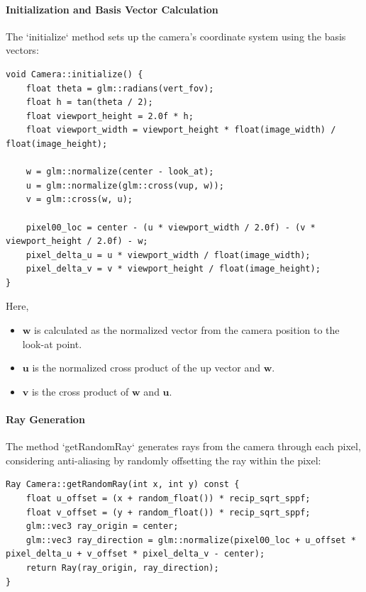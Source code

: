 \documentclass[12pt]{article}
\begin{document}
\paragraph{Initialization and Basis Vector Calculation}
The `initialize` method sets up the camera's coordinate system using the basis vectors:

\begin{verbatim}
void Camera::initialize() {
    float theta = glm::radians(vert_fov);
    float h = tan(theta / 2);
    float viewport_height = 2.0f * h;
    float viewport_width = viewport_height * float(image_width) / float(image_height);

    w = glm::normalize(center - look_at);
    u = glm::normalize(glm::cross(vup, w));
    v = glm::cross(w, u);

    pixel00_loc = center - (u * viewport_width / 2.0f) - (v * viewport_height / 2.0f) - w;
    pixel_delta_u = u * viewport_width / float(image_width);
    pixel_delta_v = v * viewport_height / float(image_height);
}
\end{verbatim}

Here,
\begin{itemize}
    \item \(\mathbf{w}\) is calculated as the normalized vector from the camera position to the look-at point.
    \item \(\mathbf{u}\) is the normalized cross product of the up vector and \(\mathbf{w}\).
    \item \(\mathbf{v}\) is the cross product of \(\mathbf{w}\) and \(\mathbf{u}\).
\end{itemize}

\paragraph{Ray Generation}
The method `getRandomRay` generates rays from the camera through each pixel, considering anti-aliasing by randomly offsetting the ray within the pixel:

\begin{verbatim}
Ray Camera::getRandomRay(int x, int y) const {
    float u_offset = (x + random_float()) * recip_sqrt_sppf;
    float v_offset = (y + random_float()) * recip_sqrt_sppf;
    glm::vec3 ray_origin = center;
    glm::vec3 ray_direction = glm::normalize(pixel00_loc + u_offset * pixel_delta_u + v_offset * pixel_delta_v - center);
    return Ray(ray_origin, ray_direction);
}
\end{verbatim}
\end{document}
